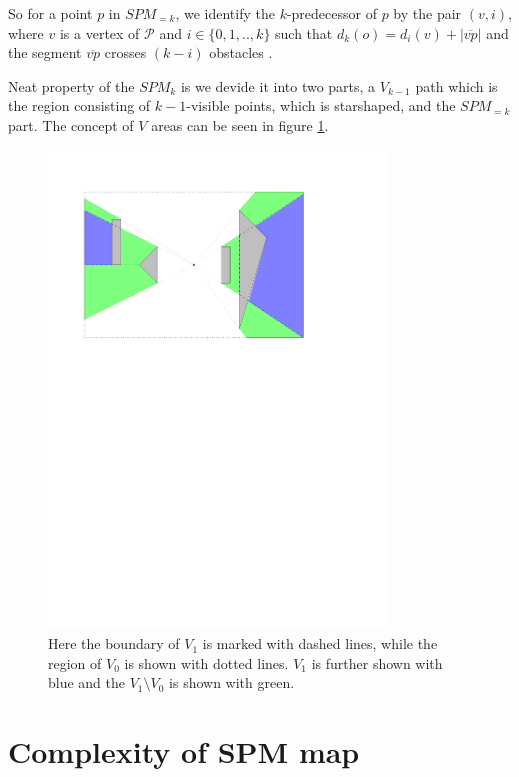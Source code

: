 So for a point $p$ in $SPM_{=k}$, we identify the $k$-predecessor of $p$ by the pair $(v,i)$, where $v$
is a vertex of $\mathcal{P}$ and $i \in \{0,1,..,k\}$ such that $d_k(o) = d_i(v) + |\overline{vp}|$ and the
segment $\overline{vp}$ crosses $(k-i)$ obstacles \cite{HershbergerKS17}.

Neat property of the $SPM_k$ is we devide it into two parts, a $V_{k-1}$ path which is the region consisting of
$k-1$-visible points, which is starshaped, and the $SPM_{=k}$ part. The concept of $V$ areas can be seen in
figure \ref{fig:regions}.

\begin{figure}[H] 
	\centering
	\includegraphics[width=0.8\textwidth]{figures/regions.pdf}
	\caption{Here the boundary of $V_1$ is marked with dashed lines, while the region of $V_0$ is shown with 
	         dotted lines. $V_1$ is further shown with blue and the $V_1 \setminus V_0$ is shown with green.}
	\label{fig:regions} 
\end{figure}

\section{Complexity of SPM map}

